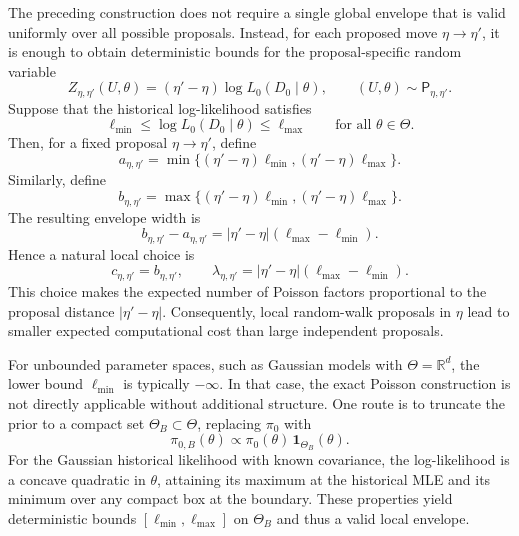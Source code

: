 The preceding construction does not require a single global envelope that is valid uniformly over all possible proposals.
Instead, for each proposed move $\eta\to\eta'$, it is enough to obtain deterministic bounds for the proposal-specific random variable
\begin{equation}
    Z_{\eta,\eta'}(U,\theta)
    =
    (\eta'-\eta)\log L_0(D_0\mid \theta),
    \qquad
    (U,\theta)\sim\mathsf P_{\eta,\eta'}.
\end{equation}
Suppose that the historical log-likelihood satisfies
\begin{equation}
    \ell_{\min}
    \le
    \log L_0(D_0\mid\theta)
    \le
    \ell_{\max}
    \qquad
    \text{for all }\theta\in\Theta.
\end{equation}
Then, for a fixed proposal $\eta\to\eta'$, define
\begin{equation}
    a_{\eta,\eta'}
    =
    \min\{(\eta'-\eta)\ell_{\min},
          (\eta'-\eta)\ell_{\max}\}.
\end{equation}
Similarly, define
\begin{equation}
    b_{\eta,\eta'}
    =
    \max\{(\eta'-\eta)\ell_{\min},
          (\eta'-\eta)\ell_{\max}\}.
\end{equation}
The resulting envelope width is
\begin{equation}
    b_{\eta,\eta'}-a_{\eta,\eta'}
    =
    |\eta'-\eta|(\ell_{\max}-\ell_{\min}).
\end{equation}
Hence a natural local choice is
\begin{equation}
    c_{\eta,\eta'}
    =
    b_{\eta,\eta'},
    \qquad
    \lambda_{\eta,\eta'}
    =
    |\eta'-\eta|(\ell_{\max}-\ell_{\min}).
\end{equation}
This choice makes the expected number of Poisson factors proportional to the proposal distance $|\eta'-\eta|$.
Consequently, local random-walk proposals in $\eta$ lead to smaller expected computational cost than large independent proposals.

For unbounded parameter spaces, such as Gaussian models with $\Theta=\mathds{R}^d$, the lower bound $\ell_{\min}$ is typically $-\infty$.
In that case, the exact Poisson construction is not directly applicable without additional structure.
One route is to truncate the prior to a compact set $\Theta_B \subset \Theta$, replacing $\pi_0$ with
\begin{equation}
    \pi_{0,B}(\theta)
    \propto
    \pi_0(\theta)\,\mathbf{1}_{\Theta_B}(\theta).
\end{equation}
For the Gaussian historical likelihood with known covariance, the log-likelihood is a concave quadratic in $\theta$, attaining its maximum at the historical MLE and its minimum over any compact box at the boundary.
These properties yield deterministic bounds $[\ell_{\min}, \ell_{\max}]$ on $\Theta_B$ and thus a valid local envelope.

